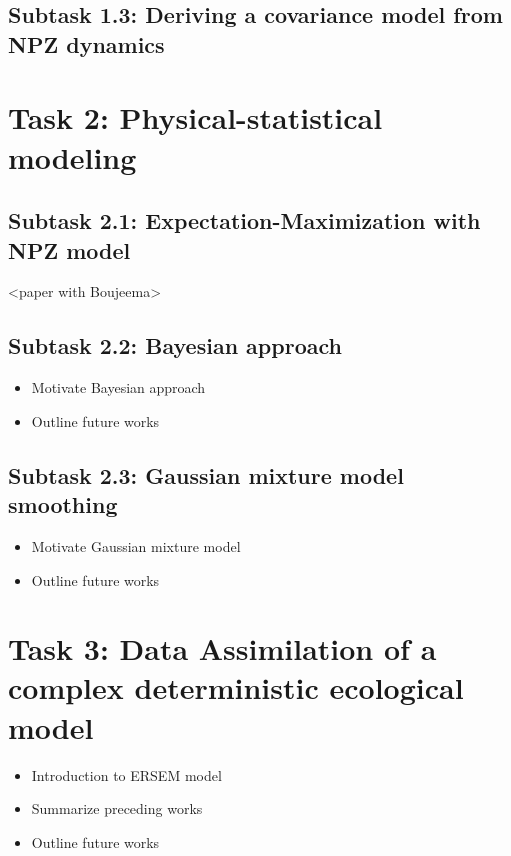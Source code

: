 		\subsection{Subtask 1.3: Deriving a covariance model from NPZ dynamics}
		\label{datadriv:npzcov}


	\section{Task 2: Physical-statistical modeling}
	\label{physstat}

		\subsection{Subtask 2.1: Expectation-Maximization with NPZ model}
		\label{physstat:EM}

			<paper with Boujeema>

		\subsection{Subtask 2.2: Bayesian approach}
		\label{physstat:bayes}

			\begin{itemize}
				\item Motivate Bayesian approach
				\item Outline future works
			\end{itemize}

		\subsection{Subtask 2.3: Gaussian mixture model smoothing}
		\label{physstat:GM}

			\begin{itemize}
				\item Motivate Gaussian mixture model
				\item Outline future works
			\end{itemize}

	\section{Task 3: Data Assimilation of a complex deterministic ecological model}
	\label{moddriv}

		\begin{itemize}
			\item Introduction to ERSEM model
			\item Summarize preceding works
			\item Outline future works
		\end{itemize}
